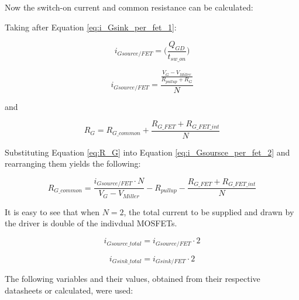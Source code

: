     Now the switch-on current and common resistance can be calculated:
    
    Taking after Equation \ref{eq:i_Gsink_per_fet_1}:

    \begin{equation}
        i_{Gsource/FET} = \bigg( \frac{Q_{GD}}{t_{sw{\_}on}} \bigg)
        \label{eq:i_Gsource_per_fet_1}
    \end{equation}    
    
    
    
    \begin{equation}
        i_{Gsource/FET} = \frac{\frac{V_G - V_{Miller}}{R_{pullup} + R_G}}{N}
        \label{eq:i_Gsoursce_per_fet_2}
    \end{equation}
    
    and
    
    \begin{equation}
        R_G = R_{G{\_}common} + \frac{R_{G{\_}FET} + R_{G{\_}FET{\_}int}}{N}
        \label{eq:R_G}
    \end{equation}
    
    Substituting Equation \ref{eq:R_G} into Equation \ref{eq:i_Gsoursce_per_fet_2} and rearranging them yields the following:
    
    \begin{equation}
        R_{G{\_}common} = \frac{i_{Gsource/FET} \cdot N}{V_G - V_{Miller}} - R_{pullup} - \frac{R_{G{\_}FET} + R_{G{\_}FET{\_}int}}{N}
        \label{eq:R_G_common}
    \end{equation}
    
    It is easy to see that when $N = 2$, the total current to be supplied and drawn by the driver is double of the indivdual MOSFETs.
    
    
    \begin{equation}
        i_{Gsource{\_}total} = i_{Gsource/FET} \cdot 2
        \label{eq:i_G_source_total}
    \end{equation}
    
    \begin{equation}
        i_{Gsink{\_}total} = i_{Gsink/FET} \cdot 2
        \label{eq:i_G_sink_total}
    \end{equation}
    
    The following variables and their values, obtained from their respective datasheets or calculated, were used:
    
